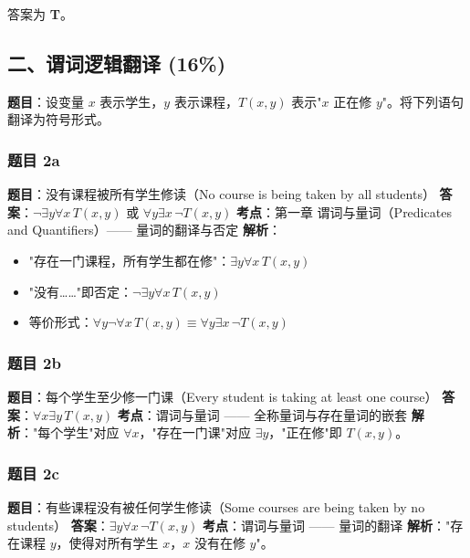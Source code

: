 \documentclass[10pt,a4paper,openany]{ctexbook}
\theoremstyle{definition}
\theoremstyle{remark}
\begin{document}
答案为 \textbf{T}。
\vspace{-2pt}

\subsection{二、谓词逻辑翻译 (16\%)}

\textbf{题目}：设变量 $x$ 表示学生，$y$ 表示课程，$T(x,y)$ 表示"$x$ 正在修 $y$"。将下列语句翻译为符号形式。
\subsubsection{题目 2a}

\textbf{题目}：没有课程被所有学生修读（No course is being taken by all students）
\textbf{答案}：$\neg \exists y \forall x\, T(x,y)$ 或 $\forall y \exists x\, \neg T(x,y)$
\textbf{考点}：第一章 谓词与量词（Predicates and Quantifiers）—— 量词的翻译与否定
\textbf{解析}：
\begin{itemize}
\item "存在一门课程，所有学生都在修"：$\exists y \forall x\, T(x,y)$
\item "没有……"即否定：$\neg \exists y \forall x\, T(x,y)$
\item 等价形式：$\forall y \neg \forall x\, T(x,y) \equiv \forall y \exists x\, \neg T(x,y)$

\end{itemize}

\vspace{-2pt}

\subsubsection{题目 2b}

\textbf{题目}：每个学生至少修一门课（Every student is taking at least one course）
\textbf{答案}：$\forall x \exists y\, T(x,y)$
\textbf{考点}：谓词与量词 —— 全称量词与存在量词的嵌套
\textbf{解析}："每个学生"对应 $\forall x$，"存在一门课"对应 $\exists y$，"正在修"即 $T(x,y)$。
\vspace{-2pt}

\subsubsection{题目 2c}

\textbf{题目}：有些课程没有被任何学生修读（Some courses are being taken by no students）
\textbf{答案}：$\exists y \forall x\, \neg T(x,y)$
\textbf{考点}：谓词与量词 —— 量词的翻译
\textbf{解析}："存在课程 $y$，使得对所有学生 $x$，$x$ 没有在修 $y$"。
\vspace{-2pt}
\end{document}
